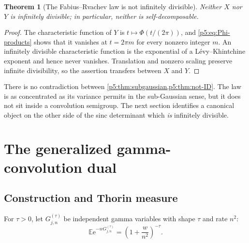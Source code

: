\documentclass[11pt]{article}
\numberwithin{equation}{section}
\newtheorem{theorem}{Theorem}[section]
\theoremstyle{definition}
\theoremstyle{remark}
\newcommand{\E}{\mathbb E}
\newcommand{\e}{\mathrm e}
\begin{document}
\begin{theorem}[The Fabius--Rvachev law is not infinitely divisible]
\label{p5:thm:not-ID}
Neither $X$ nor $Y$ is infinitely divisible; in particular, neither is
self-decomposable.
\end{theorem}

\begin{proof}
The characteristic function of $Y$ is
$t\mapsto\Phi(t/(2\pi))$, and \cref{p5:eq:Phi-products} shows that it vanishes at
$t=2\pi m$ for every nonzero integer $m$.  An infinitely divisible
characteristic function is the exponential of a L\'evy--Khintchine exponent
and hence never vanishes.  Translation and nonzero scaling preserve infinite
divisibility, so the assertion transfers between $X$ and $Y$.
\end{proof}

\begin{boxedremark}
There is no contradiction between \cref{p5:thm:subgaussian,p5:thm:not-ID}.  The law
is as concentrated as its variance permits in the sub-Gaussian sense, but it
does not sit inside a convolution semigroup.  The next section identifies a
canonical object on the other side of the sinc determinant which \emph{is}
infinitely divisible.
\end{boxedremark}

\section{The generalized gamma-convolution dual}

\subsection{Construction and Thorin measure}

For $\tau>0$, let $G_{j,n}^{(\tau)}$ be independent gamma variables with shape
$\tau$ and rate $n^2$:
\begin{equation}\label{p5:eq:gamma-LT}
 \E\e^{-wG_{j,n}^{(\tau)}}=\left(1+\frac{w}{n^2}\right)^{-\tau}.
\end{equation}
\end{document}
